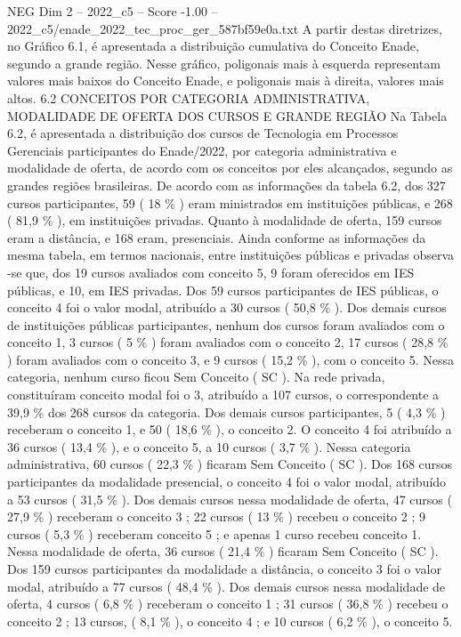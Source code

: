 \begin{textsample}{NEG Dim 2 – 2022\_c5 – Score -1.00 – 2022\_c5/enade\_2022\_tec\_proc\_ger\_587bf59e0a.txt}
A partir destas diretrizes, no Gráfico 6.1, é apresentada a distribuição cumulativa do Conceito Enade, segundo a grande região.
Nesse gráfico, poligonais mais à esquerda representam valores mais baixos do Conceito Enade, e poligonais mais à direita, valores mais altos. 6.2 CONCEITOS POR CATEGORIA ADMINISTRATIVA, MODALIDADE DE OFERTA DOS CURSOS E GRANDE REGIÃO Na Tabela 6.2, é apresentada a distribuição dos cursos de Tecnologia em Processos Gerenciais participantes do Enade/2022, por categoria administrativa e modalidade de oferta, de acordo com os conceitos por eles alcançados, segundo as grandes regiões brasileiras.
De acordo com as informações da tabela 6.2, dos 327 cursos participantes, 59 ( 18 \% ) eram ministrados em instituições públicas, e 268 ( 81,9 \% ), em instituições privadas.
Quanto à modalidade de oferta, 159 cursos eram a distância, e 168 eram, presenciais.
Ainda conforme as informações da mesma tabela, em termos nacionais, entre instituições públicas e privadas observa -se que, dos 19 cursos avaliados com conceito 5, 9 foram oferecidos em IES públicas, e 10, em IES privadas.
Dos 59 cursos participantes de IES públicas, o conceito 4 foi o valor modal, atribuído a 30 cursos ( 50,8 \% ).
Dos demais cursos de instituições públicas participantes, nenhum dos cursos foram avaliados com o conceito 1, 3 cursos ( 5 \% ) foram avaliados com o conceito 2, 17 cursos ( 28,8 \% ) foram avaliados com o conceito 3, e 9 cursos ( 15,2 \% ), com o conceito 5.
Nessa categoria, nenhum curso ficou Sem Conceito ( SC ).
Na rede privada, constituíram conceito modal foi o 3, atribuído a 107 cursos, o correspondente a 39,9 \% dos 268 cursos da categoria.
Dos demais cursos participantes, 5 ( 4,3 \% ) receberam o conceito 1, e 50 ( 18,6 \% ), o conceito 2.
O conceito 4 foi atribuído a 36 cursos ( 13,4 \% ), e o conceito 5, a 10 cursos ( 3,7 \% ).
Nessa categoria administrativa, 60 cursos ( 22,3 \% ) ficaram Sem Conceito ( SC ).
Dos 168 cursos participantes da modalidade presencial, o conceito 4 foi o valor modal, atribuído a 53 cursos ( 31,5 \% ).
Dos demais cursos nessa modalidade de oferta, 47 cursos ( 27,9 \% ) receberam o conceito 3 ; 22 cursos ( 13 \% ) recebeu o conceito 2 ; 9 cursos ( 5,3 \% ) receberam conceito 5 ; e apenas 1 curso recebeu conceito 1.
Nessa modalidade de oferta, 36 cursos ( 21,4 \% ) ficaram Sem Conceito ( SC ).
Dos 159 cursos participantes da modalidade a distância, o conceito 3 foi o valor modal, atribuído a 77 cursos ( 48,4 \% ).
Dos demais cursos nessa modalidade de oferta, 4 cursos ( 6,8 \% ) receberam o conceito 1 ; 31 cursos ( 36,8 \% ) recebeu o conceito 2 ; 13 cursos, ( 8,1 \% ), o conceito 4 ; e 10 cursos ( 6,2 \% ), o conceito 5.

\end{textsample}
